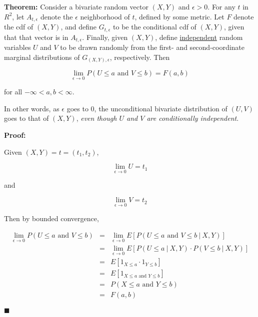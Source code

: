 \documentclass[11pt]{article}
\begin{document}
{\bf Theorem:}  Consider a bivariate random vector $(X,Y)$ and $\epsilon >
0$.  For any $t$ in $R^2$, let $A_{t,\epsilon}$ denote the $\epsilon$
neighborhood of $t$, defined by some metric.  Let $F$ denote the
cdf of $(X,Y)$, and define $G_{t,\epsilon}$ to be the
conditional cdf of $(X,Y)$, given that that vector is in
$A_{t,\epsilon}$.  Finally, given $(X,Y)$, define \underline{independent}
random variables $U$ and $V$ to be drawn randomly from the first- and
second-coordinate marginal distributions of $G_{(X,Y),\epsilon}$,
respectively.  Then

\begin{equation}
\lim_{\epsilon \rightarrow 0}
P
\left (
U \leq a \textrm{ and } V \leq b
\right )
= F(a,b)
\end{equation}

for all $-\infty < a,b < \infty$.  

In other words, as $\epsilon$ goes to 0, the unconditional bivariate
distribution of $(U,V)$ goes to that of $(X,Y)$, {\it even though $U$
and $V$ are conditionally independent}.

{\bf Proof:}

Given $(X,Y) = t = (t_1,t_2)$,

\begin{equation}
\lim_{\epsilon \rightarrow 0} U = t_1
\end{equation}

and

\begin{equation}
\lim_{\epsilon \rightarrow 0} V = t_2
\end{equation}


Then by bounded convergence,

\begin{eqnarray}
\lim_{\epsilon \rightarrow 0}
P
\left (
U \leq a \textrm{ and } V \leq b
\right )
&=& 
\lim_{\epsilon \rightarrow 0}
E \left [
P
\left (
U \leq a \textrm{ and } V \leq b
~|~ X,Y \right )
\right ] \\ 
&=& 
\lim_{\epsilon \rightarrow 0}
E \left [
P(U \leq a ~|~ X,Y ) \cdot
P(V \leq b ~|~ X,Y ) 
\right ] \\
&=& E \left [
1_{X \leq a} \cdot
1_{Y \leq b}
\right ] \\
&=& E \left [
1_{X \leq a \textrm{ and } Y \leq b}
\right ] \\
&=& P(X \leq a \textrm{ and } Y \leq b) \\
&=& F(a,b)
\end{eqnarray}

$\blacksquare$
\end{document}
